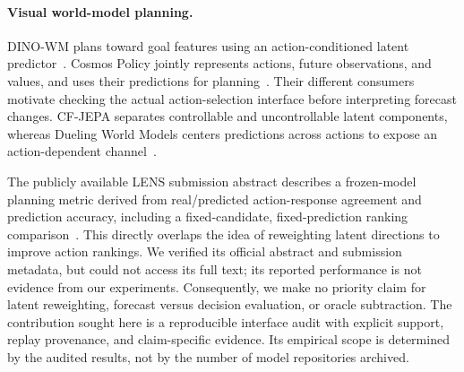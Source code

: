 {\paragraph{Visual world-model planning.}
DINO-WM plans toward goal features using an action-conditioned latent
predictor~\cite{zhou2024dinowm}. Cosmos Policy jointly represents actions,
future observations, and values, and uses their predictions for
planning~\cite{kim2026cosmos}. Their different consumers motivate checking
the actual action-selection interface before interpreting forecast changes.
CF-JEPA separates controllable and uncontrollable latent components,
whereas Dueling World Models centers predictions across actions to expose
an action-dependent channel~\cite{byrd2026cfjepa,li2026dueling}.

The publicly available LENS submission abstract describes a frozen-model
planning metric derived from real/predicted action-response agreement and
prediction accuracy, including a fixed-candidate, fixed-prediction ranking
comparison~\cite{anonymous2026lens}. This directly overlaps the idea of
reweighting latent directions to improve action rankings. We verified its
official abstract and submission metadata, but could not access its full
text; its reported performance is not evidence from our experiments.
Consequently, we make no priority claim for latent reweighting, forecast
versus decision evaluation, or oracle subtraction. The contribution sought
here is a reproducible interface audit with explicit support, replay
provenance, and claim-specific evidence. Its empirical scope is determined
by the audited results, not by the number of model repositories archived.
}

